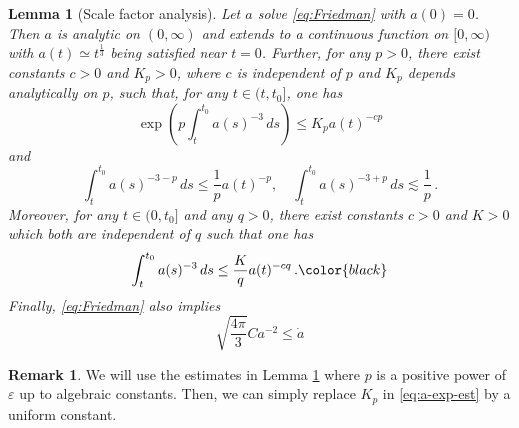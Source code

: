 \documentclass[11pt,leqno,textwidth=10cm]{amsart}
\numberwithin{equation}{section}
\theoremstyle{definition}
\newtheorem{remark}[definition]{Remark}
\theoremstyle{plain}
\newtheorem{lemma}[definition]{Lemma}
\newcommand{\1}{\mathbbm{1}}
\renewcommand{\epsilon}{\varepsilon}
\newcommand{\change}[1]{\color{black}#1\color{black}}
\begin{document}
\begin{lemma}[Scale factor analysis]\label{lem:scale-factor}Let $a$ solve \eqref{eq:Friedman} with $a(0)=0$. Then $a$ is analytic on $(0,\infty)$ and extends to a continuous function on $[0,\infty)$ with $a(t)\simeq t^{\frac13}$ being satisfied near $t=0$. Further, for any $p>0$, there exist constants $c>0$ and $K_p>0$, where $c$ is independent of $p$ and $K_p$ depends analytically on $p$, such that, for any $t\in(t,t_0]$, one has
\begin{equation}\label{eq:a-exp-est}
\exp\left(p\int_t^{t_0}a(s)^{-3}\,ds\right)\leq K_pa(t)^{-cp}
\end{equation}
and
\begin{equation}\label{eq:a-integrals}
\int_t^{t_0}a(s)^{-3-p}\,ds\leq\frac1p a(t)^{-p},\quad \int_t^{t_0}a(s)^{-3+p}\,ds\lesssim\frac{1}p\,.
\end{equation}
Moreover, for any $t\in(0,t_0]$ and any $q>0$, \change{there exist constants $c>0$ and $K>0$ which both are independent of $q$ such that one has
\begin{equation}\label{eq:log-est}
\int_t^{t_0}a(s)^{-3}\,ds\leq \frac{K}qa(t)^{-cq}\,.}
\end{equation}
Finally, \eqref{eq:Friedman} also implies
\begin{equation}\label{eq:diff-ineq-Friedman}
\sqrt{\frac{4\pi}3}C a^{-2}\leq \dot{a}
\end{equation}
\end{lemma}
\begin{remark}\label{rem:scale-factor}
We will use the estimates in Lemma \ref{lem:scale-factor} where $p$ is a positive power of $\epsilon$ up to algebraic constants. Then, we can simply replace $K_p$ in \eqref{eq:a-exp-est} by a uniform constant. %
%
\end{remark}
\end{document}
